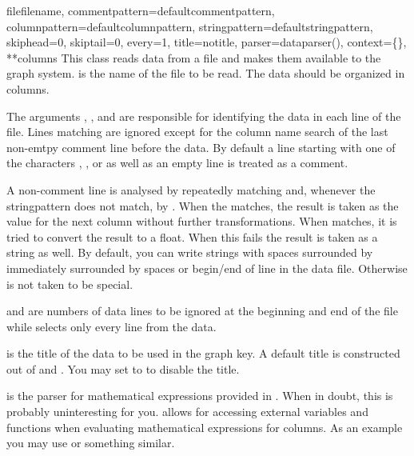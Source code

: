 \begin{classdesc}{file}{filename,
                        commentpattern=defaultcommentpattern,
                        columnpattern=defaultcolumnpattern,
                        stringpattern=defaultstringpattern,
                        skiphead=0, skiptail=0, every=1, title=notitle,
                        parser=dataparser(), context=\{\}, **columns}
  This class reads data from a file and makes them available to the
  graph system.  is the name of the file to be read.
  The data should be organized in columns.

  The arguments , , and
   are responsible for identifying the data in each
  line of the file. Lines matching  are ignored
  except for the column name search of the last non-emtpy comment line
  before the data. By default a line starting with one of the
  characters \character{\#}, \character{\%}, or \character{!} as well
  as an empty line is treated as a comment.

  A non-comment line is analysed by repeatedly matching
   and, whenever the stringpattern does not match,
  by . When the  matches, the
  result is taken as the value for the next column without further
  transformations. When  matches, it is tried to
  convert the result to a float. When this fails the result is taken
  as a string as well. By default, you can write strings with spaces
  surrounded by \character{\textquotedbl} immediately surrounded by
  spaces or begin/end of line in the data file. Otherwise
  \character{\textquotedbl} is not taken to be special.

   and  are numbers of data lines to be
  ignored at the beginning and end of the file while 
  selects only every  line from the data.

   is the title of the data to be used in the graph key. A
  default title is constructed out of  and
  . You may set  to  to disable
  the title.

   is the parser for mathematical expressions provided in
  . When in doubt, this is probably uninteresting for
  you.  allows for accessing external variables and
  functions when evaluating mathematical expressions for columns. As
  an example you may use  or something similar.


\end{classdesc}
